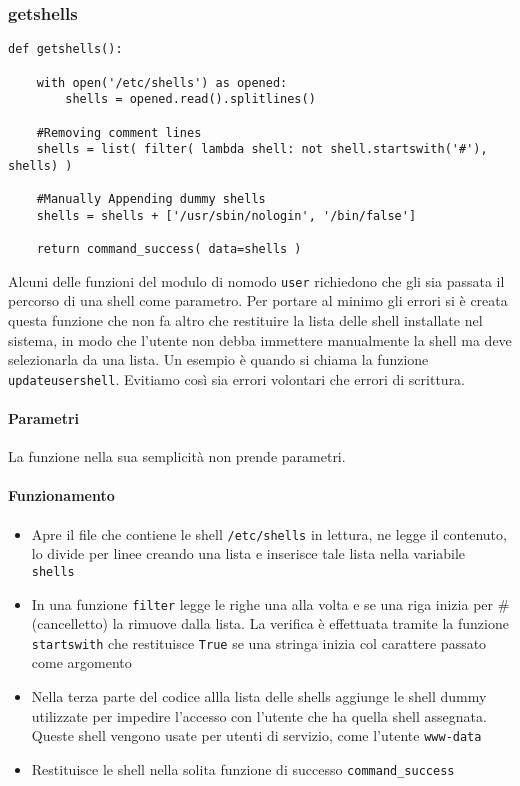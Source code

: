 \documentclass[11pt]{article}
\begin{document}
\subsubsection{getshells}\label{getshells}
\begin{lstlisting}
def getshells():

    with open('/etc/shells') as opened:
        shells = opened.read().splitlines()

    #Removing comment lines
    shells = list( filter( lambda shell: not shell.startswith('#'), shells) )

    #Manually Appending dummy shells
    shells = shells + ['/usr/sbin/nologin', '/bin/false']

    return command_success( data=shells )
\end{lstlisting}
Alcuni delle funzioni del modulo di nomodo \texttt{user} richiedono che gli sia passata il percorso di una shell
come parametro. Per portare al minimo gli errori si è creata questa funzione che non fa altro che restituire
la lista delle shell installate nel sistema, in modo che l'utente non debba immettere manualmente la shell
ma deve selezionarla da una lista. Un esempio è quando si chiama la funzione \texttt{updateusershell}.
Evitiamo così sia errori volontari che errori di scrittura.
\paragraph{Parametri}
La funzione nella sua semplicità non prende parametri.
\paragraph{Funzionamento}
\begin{itemize}
	\item{Apre il file che contiene le shell \texttt{/etc/shells} in lettura, ne legge il contenuto,
		lo divide per linee creando una lista e inserisce tale lista nella variabile \texttt{shells}}
	\item{In una funzione \texttt{filter} legge le righe una alla volta e se una riga inizia per \string# (cancelletto)
		la rimuove dalla lista. La verifica è effettuata tramite la funzione \texttt{startswith} che
		restituisce \texttt{True} se una stringa inizia col carattere passato come argomento}
	\item{Nella terza parte del codice allla lista delle shells aggiunge le shell dummy utilizzate
		per impedire l'accesso con l'utente che ha quella shell assegnata. Queste shell vengono
		usate per utenti di servizio, come l'utente \texttt{www-data}}
	\item{Restituisce le shell nella solita funzione di successo \texttt{command\_success}}
\end{itemize}
\end{document}

